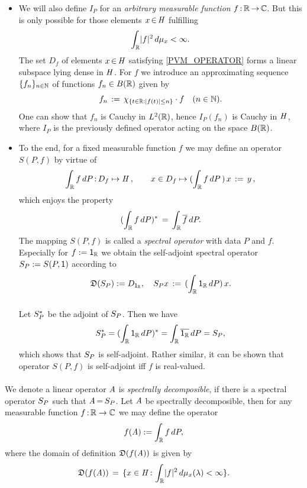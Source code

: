 \documentclass[11pt,twoside]{article}
\begin{document}
\begin{itemize}[leftmargin=12pt,itemsep=2mm]
\item[4.]
We will also define $I_P$
for an \textit{arbitrary measurable function} $f{\,:\,}{\mathbb{R}} {\,\to\,} {\mathbb{C}}$.
But this is only possible for those elements $x {\,\in\,} \mathit{H}$ fulfilling
\begin{equation}\label{PVM_OPERATOR}
\int_{\R} \abs{f} ^2 \, d \mu_x < \infty.
\end{equation}
The set $D_f$ of elements $x {\,\in\,} \mathit{H}$ satisfying \eqref{PVM_OPERATOR}
forms a linear subspace lying dense in $\mathit{H}$.
For $f$ we introduce an approximating sequence $\{f_n\}_{n \in {\mathbb{N}}}$
of functions $f_n \in B({\mathbb{R}})$ given by
\[
f_n \eqdef \chi_{ \{t \in \R: \abs{f(t)} \leq n\}} \cdot f
\quad (n \in \N).
\]
One can show that $f_n$ is Cauchy in $L^2({\mathbb{R}})$,
hence $I_P(f_n)$ is Cauchy in $\mathit{H}$,
where $I_P$ is the previously defined operator acting on the space $B({\mathbb{R}})$.

\item[5.]
To the end,
for a fixed measurable function $f$
we may define an operator $S(P,f)$ by virtue of
\begin{equation}\label{SPECTRAL_OPERATOR}
\int_{{\mathbb{R}}} f \, dP {\,:\,} D_f \mapsto \mathit{H}\,,
\quad \quad
x \in D_f \mapsto (\int_{{\mathbb{R}}} f \, d{P}\,) \, x \,:=\, y\,,
\end{equation}
which enjoys the property
\[
(\int_{{\mathbb{R}}} f \, d{P})^* \,=\, \int_{{\mathbb{R}}} \overline{f} \, dP.
\]
The mapping $S(P,f)$ is called a \textit{spectral operator}
with data $P$ and $f$.
Especially for $f := {\mathsf{1}}_{{\mathbb{R}}}$ 
we obtain the self-adjoint spectral operator ${S}_P := {S}(P,{\mathsf{1}})$
according to
\[
\mathfrak{D}({S}_P) := D_{{\mathsf{1}}_{{\mathbb{R}}}},
\quad {S}_P x \,:=\, (\int_{{\mathbb{R}}} {\mathsf{1}}_{{\mathbb{R}}} \, dP) \, x.
\]

\subparagraph{}
Let ${S}_P^*$ be the adjoint of ${S}_P$.
Then we have
\[
{S}_P^* = (\int_{{\mathbb{R}}} {\mathsf{1}}_{{\mathbb{R}}} \, dP)^* = \int_{{\mathbb{R}}} \overline{{\mathsf{1}}_{{\mathbb{R}}}} \, dP = {S}_P,
\]
which shows that ${S}_P$ is self-adjoint.
Rather similar,
it can be shown that operator $S(P,f)$ is self-adjoint iff $f$ is real-valued.
\end{itemize}

\paragraph{}
We denote a linear operator $\mathit{A}$ is \textit{spectrally decomposible},
if there is a spectral operator ${S}_P$ such that $\mathit{A} {\,=\,} {S}_P$.
Let $\mathit{A}$ be spectrally decomposible,
then for any measurable function $f{\,:\,}{\mathbb{R}} \to {\mathbb{C}}$ we may define the operator
\[
f(\mathit{A}) := \int_{{\mathbb{R}}} f\,dP,
\]
where the domain of definition $\mathfrak{D}(f(\mathit{A}))$ is given by
\[
\domain{f(\linA)} \=
\{ x \in \hilH \: \int_{\R} \abs{f} ^2\,d\mu_x(\lambda) < \infty \}.
\]
\end{document}
